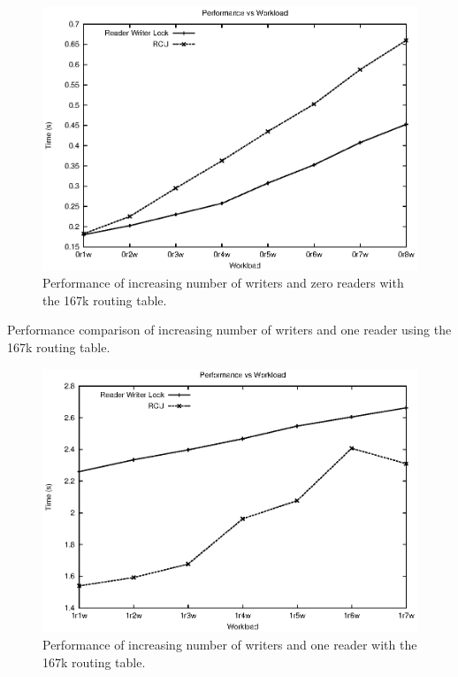 \documentclass[12pt,a4paper]{article}
\begin{document}
\begin{figure}[tph]
\includegraphics[scale = 0.7]{../images/graphs/macro_0r_vw}
\caption{Performance of increasing number of writers and zero readers with the 167k routing table.}
\label{img:macro_0r_vw}
\end{figure}


\begin{table}[tph]
\begin{center}

\end{center}
\caption{Performance comparison of increasing number of writers and one reader using the 167k routing table.}
\label{tbl:macro_1r_vw}
\end{table}


\begin{figure}[tph]
\includegraphics[scale = 0.7]{../images/graphs/macro_1r_vw}
\caption{Performance of increasing number of writers and one reader with the 167k routing table.}
\label{img:macro_1r_vw}
\end{figure}
\end{document}
